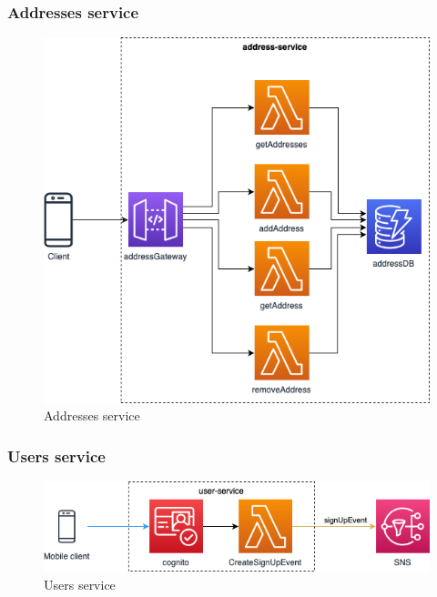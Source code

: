 \subsubsection{Addresses service}
\begin{figure}[H]
	\centering
	\includegraphics[scale=0.4]{Immagini/Backend/AWSAddresses.png}
	\caption{Addresses service}
	\label{fig:Adresses}
\end{figure}
\subsubsection{Users service}
\begin{figure}[H]
	\centering
	\includegraphics[scale=0.7]{Immagini/Backend/AWSUserService.png}
	\caption{Users service}
	\label{fig:Users}
\end{figure} 

